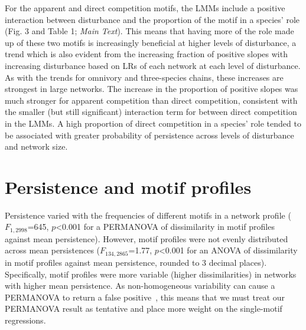 \documentclass[12pt]{article}
\begin{document}
\begin{spacing}{2.0}
    For the apparent and direct competition motifs, the LMMs include a positive interaction between disturbance and the proportion of the motif in a species' role (Fig. 3 and Table 1; \emph{Main Text}).
    This means that having more of the role made up of these two motifs is increasingly beneficial at higher levels of disturbance, a trend which is also evident from the increasing fraction of positive slopes with increasing disturbance based on LRs of each network at each level of disturbance. %
    As with the trends for omnivory and three-species chains, these increases are strongest in large networks. %
    The increase in the proportion of positive slopes was much stronger for apparent competition than direct competition, consistent with the smaller (but still significant) interaction term for between direct competition in the LMMs.
    A high proportion of direct competition in a species' role tended to be associated with greater probability of persistence across levels of disturbance and network size.
\clearpage
                
\section{Persistence and motif profiles}

    Persistence varied with the frequencies of different motifs in a network profile ($F_{1,2998}$=645, $p$\textless0.001 for a PERMANOVA of dissimilarity in motif profiles against mean persistence).
    However, motif profiles were not evenly distributed across mean persistences ($F_{134,2865}$=1.77, $p$\textless0.001 for an ANOVA of dissimilarity in motif profiles against mean persistence, rounded to 3 decimal places).
    Specifically, motif profiles were more variable (higher dissimilarities) in networks with higher mean persistence.
    As non-homogeneous variability can cause a PERMANOVA to return a false positive~\citep{Anderson2001}, this means that we must treat our PERMANOVA result as tentative and place more weight on the single-motif regressions.



\end{spacing}
\end{document}
